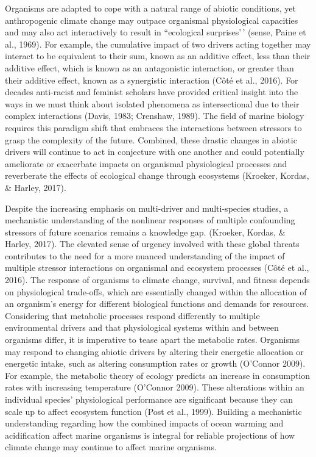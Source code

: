 \documentclass[
  11pt,
]{article}
\begin{document}
Organisms are adapted to cope with a natural range of abiotic
conditions, yet anthropogenic climate change may outpace organismal
physiological capacities and may also act interactively to result in
``ecological surprises'\,' (sense, Paine et al., 1969). For example, the
cumulative impact of two drivers acting together may interact to be
equivalent to their sum, known as an additive effect, less than their
additive effect, which is known as an antagonistic interaction, or
greater than their additive effect, known as a synergistic interaction
(Côté et al., 2016). For decades anti-racist and feminist scholars have
provided critical insight into the ways in we must think about isolated
phenomena as intersectional due to their complex interactions (Davis,
1983; Crenshaw, 1989). The field of marine biology requires this
paradigm shift that embraces the interactions between stressors to grasp
the complexity of the future. Combined, these drastic changes in abiotic
drivers will continue to act in conjecture with one another and could
potentially ameliorate or exacerbate impacts on organismal physiological
processes and reverberate the effects of ecological change through
ecosystems (Kroeker, Kordas, \& Harley, 2017).

Despite the increasing emphasis on multi-driver and multi-species
studies, a mechanistic understanding of the nonlinear responses of
multiple confounding stressors of future scenarios remains a knowledge
gap. (Kroeker, Kordas, \& Harley, 2017). The elevated sense of urgency
involved with these global threats contributes to the need for a more
nuanced understanding of the impact of multiple stressor interactions on
organismal and ecosystem processes (Côté et al., 2016). The response of
organisms to climate change, survival, and fitness depends on
physiological trade-offs, which are essentially changed within the
allocation of an organism's energy for different biological functions
and demands for resources. Considering that metabolic processes respond
differently to multiple environmental drivers and that physiological
systems within and between organisms differ, it is imperative to tease
apart the metabolic rates. Organisms may respond to changing abiotic
drivers by altering their energetic allocation or energetic intake, such
as altering consumption rates or growth (O'Connor 2009). For example,
the metabolic theory of ecology predicts an increase in consumption
rates with increasing temperature (O'Connor 2009). These alterations
within an individual species' physiological performance are significant
because they can scale up to affect ecosystem function (Post et al.,
1999). Building a mechanistic understanding regarding how the combined
impacts of ocean warming and acidification affect marine organisms is
integral for reliable projections of how climate change may continue to
affect marine organisms.
\end{document}
